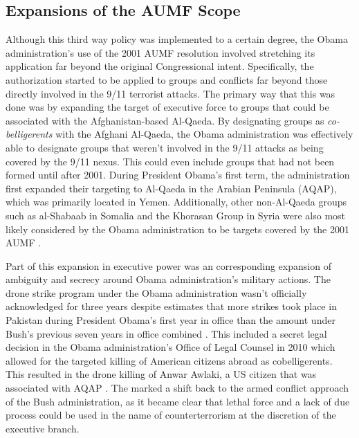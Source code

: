 \documentclass[12pt]{article}
\begin{document}
\subsection*{Expansions of the AUMF Scope}
Although this third way policy was implemented to a certain degree, the Obama administration's use of the 2001 AUMF resolution involved stretching its application far beyond the original Congressional intent.
Specifically, the authorization started to be applied to groups and conflicts far beyond those directly involved in the 9/11 terrorist attacks.
The primary way that this was done was by expanding the target of executive force to groups that could be associated with the Afghanistan-based Al-Qaeda.
By designating groups as \emph{co-belligerents} with the Afghani Al-Qaeda, the Obama administration was effectively able to designate groups that weren't involved in the 9/11 attacks as being covered by the 9/11 nexus.
This could even include groups that had not been formed until after 2001.
During President Obama's first term, the administration first expanded their targeting to Al-Qaeda in the Arabian Peninsula (AQAP), which was primarily located in Yemen.
Additionally, other non-Al-Qaeda groups such as al-Shabaab in Somalia and the Khorasan Group in Syria were also most likely considered by the Obama administration to be targets covered by the 2001 AUMF \autocite[189]{murray2015}.

Part of this expansion in executive power was an corresponding expansion of ambiguity and secrecy around Obama administration's military actions.
The drone strike program under the Obama administration wasn't officially acknowledged for three years despite estimates that more strikes took place in Pakistan during President Obama's first year in office than the amount under Bush's previous seven years in office combined \autocite[189]{murray2015}.
This included a secret legal decision in the Obama administration's Office of Legal Counsel in 2010 which allowed for the targeted killing of American citizens abroad as cobelligerents. 
This resulted in the drone killing of Anwar Awlaki, a US citizen that was associated with AQAP \autocite[191]{murray2015}.
The marked a shift back to the armed conflict approach of the Bush administration, as it became clear that lethal force and a lack of due process could be used in the name of counterterrorism at the discretion of the executive branch.
\end{document}

